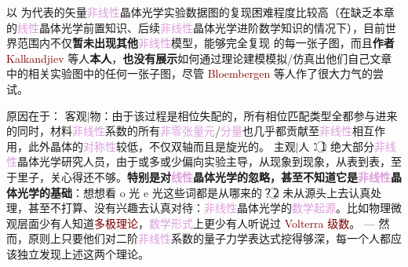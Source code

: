 以  为代表的矢量\textcolor{Plum}{非线性}\textcolor{PineGreen}{晶体光学}实验数据图的复现困难程度比较高（在缺乏本章的\textcolor{Plum}{线性}\textcolor{PineGreen}{晶体光学}前置知识、后续\textcolor{Plum}{非线性}\textcolor{PineGreen}{晶体光学}进阶数学知识的情况下），目前世界范围内不仅\textbf{暂未出现其他}\textcolor{Plum}{非线性}模型，能够完全复现  的每一张子图，而且\textbf{作者} \textcolor{Maroon}{Kalkandjiev} 等人\textbf{本人}，\textbf{也没有展示}如何通过\textcolor{NavyBlue}{理论建模}模拟/仿真出他们自己文章中的相关实验图中的任何一张子图\cite{zolotovskayaSecondharmonicConicalRefraction2011,kroupaSecondharmonicConicalRefraction2010,alekseevaShadowConicalRefraction1999,shihConicalRefractionSecondHarmonic1969,schellLaserStudiesInternal1978,velichkinaDemonstrationPhenomenaConical1980,stroganovConicalRefractionSecond1980,illarionovExperimentalObservationConical1979,féveExperimentalStudyInternal1994,grantFrequencydoubledConicallyrefractedGaussian2014,maSumfrequencyGenerationFemtosecond2018,peetFrequencyDoublingLaser2011}，尽管 \textcolor{Maroon}{Bloembergen} 等人作了很大力气的尝试\cite{shihConicalRefractionSecondHarmonic1969,schellLaserStudiesInternal1978}。

原因在于：{\one} 客观$\Big|$物：由于该过程是\textcolor{PineGreen}{相位失配}的，所有\textcolor{PineGreen}{相位匹配类型}全都参与进来的同时，材料\textcolor{Plum}{非线性}系数的所有\textcolor{Plum}{非零张量元}/\textcolor{Plum}{分量}也几乎都贡献至\textcolor{Plum}{非线性}相互作用\cite{kroupaSecondharmonicConicalRefraction2010}，此外晶体的\textcolor{Plum}{对称性}较低，不仅\textcolor{NavyBlue}{双轴}而且是\textcolor{NavyBlue}{旋光}的\cite{zolotovskayaSecondharmonicConicalRefraction2011}。{\two} 主观$\Big|$人：\textcircled{1} 绝大部分\textcolor{Plum}{非线性}\textcolor{PineGreen}{晶体光学}研究人员，由于或多或少偏向\textcolor{NavyBlue}{实验主导}，从现象到现象，从表到表，至于里子，关心得还不够。\textbf{特别是对\textcolor{Plum}{线性}\textcolor{PineGreen}{晶体光学}的忽略，甚至不知道它是\textcolor{Plum}{非线性}\textcolor{PineGreen}{晶体光学}的基础}：想想看 \textcolor{PineGreen}{o} 光 \textcolor{PineGreen}{e} 光这些词都是从哪来的？\textcircled{2} 未从源头上去认真处理，甚至不打算、没有兴趣去认真对待：\textcolor{Plum}{非线性}\textcolor{PineGreen}{晶体光学}的\textcolor{Plum}{数学起源}。比如\textcolor{NavyBlue}{物理微观}层面少有人知道\textcolor{Maroon}{多极理论}，\textcolor{Plum}{数学形式}上更少有人听说过 \textcolor{Maroon}{Volterra 级数}。 --- 然而，原则上只要他们对二阶\textcolor{Plum}{非线性}系数的\textcolor{NavyBlue}{量子力学}表达式挖得够深，每一个人都应该独立发现上述这两个理论。

